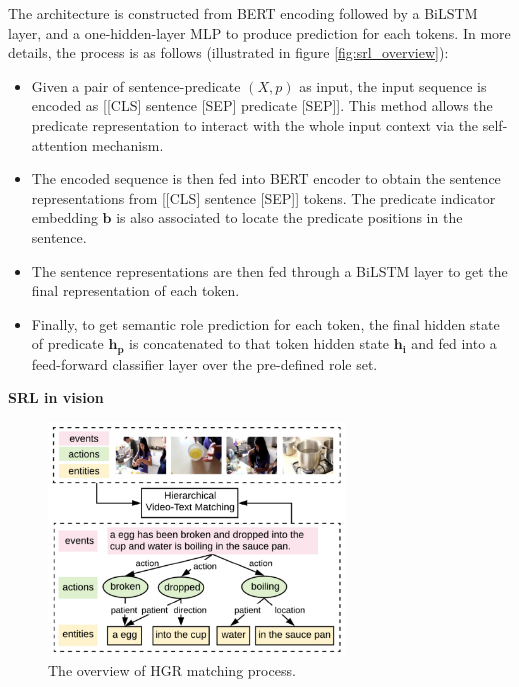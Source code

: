 The architecture is constructed from BERT encoding followed by a BiLSTM layer, and a one-hidden-layer MLP to produce prediction for each tokens. In more details, the process is as follows (illustrated in figure \ref{fig:srl_overview}):
\begin{itemize}
    \item Given a pair of sentence-predicate $(X, p)$ as input, the input sequence is encoded as [[CLS] sentence [SEP] predicate [SEP]]. This method allows the predicate representation to interact with the whole input context via the self-attention mechanism.
    \item The encoded sequence is then fed into BERT encoder to obtain the sentence representations from [[CLS] sentence [SEP]] tokens. The predicate indicator embedding $\mathbf{b}$ is also associated to locate the predicate positions in the sentence.
    \item The sentence representations are then fed through a BiLSTM layer to get the final representation of each token. 
    \item Finally, to get semantic role prediction for each token, the final hidden state of predicate $\mathbf{h_p}$ is concatenated to that token hidden state $\mathbf{h_i}$ and fed into a feed-forward classifier layer over the pre-defined role set.
\end{itemize}

\textbf{SRL in vision} 
\begin{figure}[!htb]
    \centering
    \includegraphics[width=0.7\textwidth]{resources/images/HGR_idea.png}
    \caption{The overview of HGR\cite{chen2020fine} matching process.}
    \label{fig:hgr_overview}
\end{figure}

